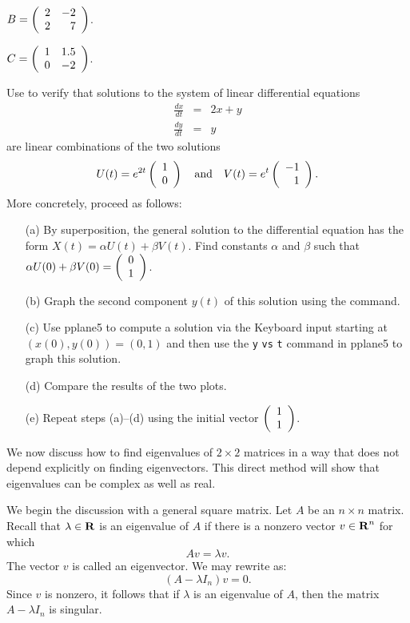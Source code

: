 \begin{exercise} \label{c4.5.5a}
$B=\left(\begin{array}{rr} 2 & -2\\ 2 &7\end{array}\right)$.
\end{exercise}
\begin{exercise} \label{c4.5.5b}
$C=\left(\begin{array}{rr} 1 & 1.5\\ 0 &-2\end{array}\right)$.
\end{exercise}

\begin{exercise} \label{c4.4.5}
Use \Matlab to verify that solutions to the system of linear differential
equations
\begin{eqnarray*}
\frac{dx}{dt} & = & 2x + y\\
\frac{dy}{dt} & = & y
\end{eqnarray*}
are linear combinations of the two solutions
\[
U(t) = e^{2t}\left(\begin{array}{r} 1 \\ 0\end{array}\right) \quad\mbox{and}\quad V(t) = e^{t}\left(\begin{array}{r} -1 \\ 1\end{array}\right).
\]
More concretely, proceed as follows:
\begin{itemize}
\item[(a)]  By superposition, the general solution to the differential
equation has the form $X(t)=\alpha U(t) + \beta V(t)$.  Find constants
$\alpha$ and $\beta$ such that $\alpha U(0) + \beta V(0) = \left(\begin{array}{r} 0 \\ 1\end{array}\right)$.
\item[(b)] Graph the second component $y(t)$ of this solution using the
 command.
\item[(c)] Use {\sf pplane5} to compute a solution via the {\sf Keyboard
input} starting at $(x(0),y(0)) = (0,1)$ and then use the
{\tt y} {\tt vs} {\tt t} command in {\sf pplane5} to graph this solution.
\item[(d)] Compare the results of the two plots.
\item[(e)]  Repeat steps (a)--(d) using the initial vector $\left(\begin{array}{r} 1 \\ 1\end{array}\right)$.
\end{itemize}
\end{exercise}


\label{S:evchp}


We now discuss how to find eigenvalues
 of $2\times 2$ matrices in a way that does
not depend explicitly on finding eigenvectors.
 This direct method will show that
eigenvalues can be complex as well as real.

We begin the discussion with a general square matrix.  Let $A$
be an $n\times n$ matrix.  Recall that $\lambda\in\mbox{$\bf{R}$}$ is an
eigenvalue of $A$ if there is a nonzero vector $v\in\mbox{$\bf{R}$}^n$ for
which
\begin{equation}  \label{eigeneqn}
Av = \lambda v.
\end{equation}
The vector $v$ is called an eigenvector.  We may rewrite
 as:
\[
(A-\lambda I_n)v = 0.
\]
Since $v$ is nonzero, it follows that if $\lambda$ is an
eigenvalue of $A$, then the matrix $A-\lambda I_n$ is singular.

